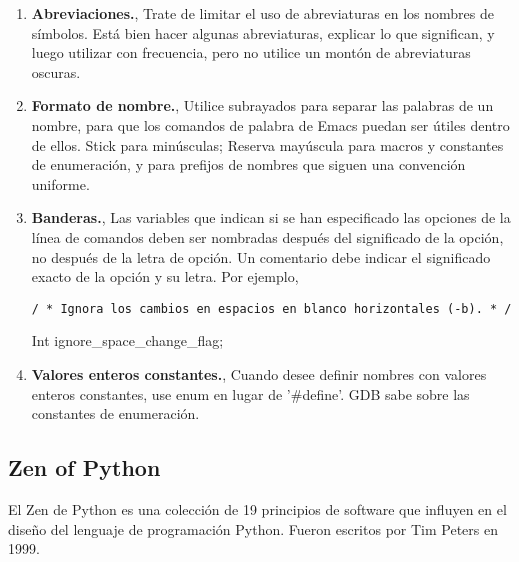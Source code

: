 \begin{enumerate}
\begin{enumerate}
	\item {\bf Abreviaciones.}, Trate de limitar el uso de abreviaturas en los nombres de símbolos. Está bien hacer algunas abreviaturas, explicar lo que significan, y luego utilizar con frecuencia, pero no utilice un montón de abreviaturas oscuras.
	\item {\bf Formato de nombre.}, Utilice subrayados para separar las palabras de un nombre, para que los comandos de palabra de Emacs puedan ser útiles dentro de ellos. Stick para minúsculas; Reserva mayúscula para macros y constantes de enumeración, y para prefijos de nombres que siguen una convención uniforme.
	\item {\bf Banderas.}, Las variables que indican si se han especificado las opciones de la línea de comandos deben ser nombradas después del significado de la opción, no después de la letra de opción. Un comentario debe indicar el significado exacto de la opción y su letra. Por ejemplo,
	\begin{verbatim}
/ * Ignora los cambios en espacios en blanco horizontales (-b). * /
	\end{verbatim}
	Int ignore\_space\_change\_flag;
	\item {\bf Valores enteros constantes.}, Cuando desee definir nombres con valores enteros constantes, use enum en lugar de '\#define'. GDB sabe sobre las constantes de enumeración.
	\end{enumerate}
\end{enumerate}

\subsection{Zen of Python}

{El Zen de Python es una colección de 19 principios de software que influyen en el diseño del lenguaje de programación Python. Fueron escritos por Tim Peters en 1999.}

